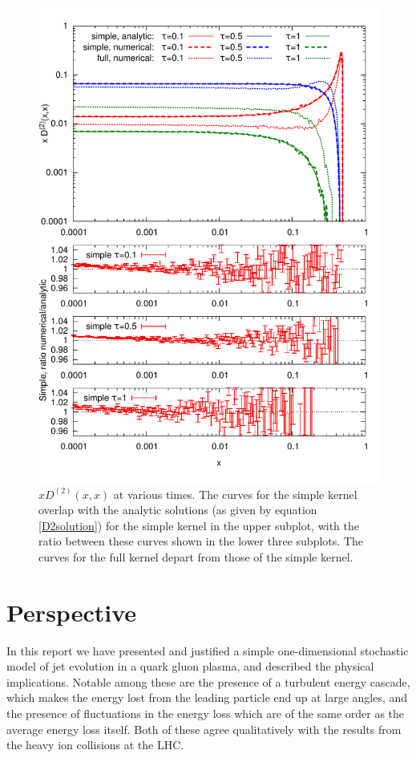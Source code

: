 \documentclass[a4paper,12pt]{article}
\numberwithin{equation}{section}
\begin{document}
\begin{figure}
\centering
\includegraphics[width=0.9\linewidth]{D2.pdf}
\vspace*{-20pt}
\caption{$x D^{(2)}(x,x)$ at various times. The curves for the simple kernel overlap with the analytic solutions (as given by equation \eqref{D2solution}) for the simple kernel in the upper subplot, with the ratio between these curves shown in the lower three subplots. The curves for the full kernel depart from those of the simple kernel.}\label{D2times}
\end{figure}


\section{Perspective}\label{perspective}
In this report we have presented and justified a simple one-dimensional stochastic model of jet evolution in a quark gluon plasma, and described the physical implications. Notable among these are the presence of a turbulent energy cascade, which makes the energy lost from the leading particle end up at large angles, and the presence of fluctuations in the energy loss which are of the same order as the average energy loss itself. Both of these agree qualitatively with the results from the heavy ion collisions at the LHC.
\end{document}
